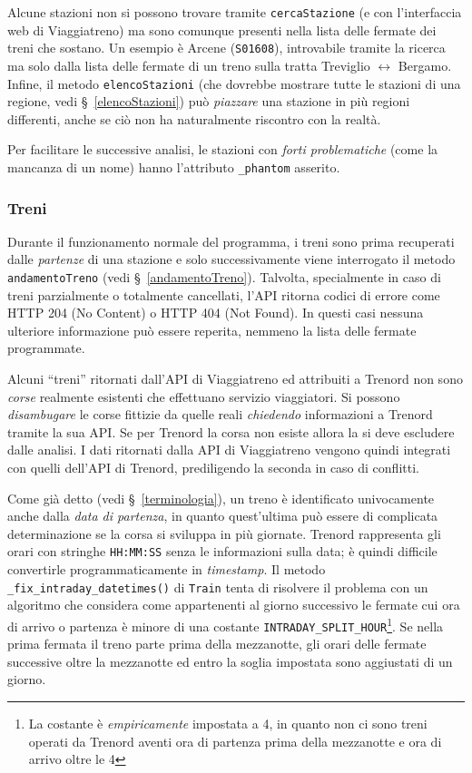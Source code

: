 \documentclass[12pt,italian]{report}
\begin{document}
Alcune stazioni non si possono trovare tramite \texttt{cercaStazione}
(e con l'interfaccia web di Viaggiatreno) ma sono comunque presenti
nella lista delle fermate dei treni che sostano.  Un esempio è Arcene
(\texttt{S01608}), introvabile tramite la ricerca ma solo dalla lista
delle fermate di un treno sulla tratta Treviglio $\leftrightarrow$
Bergamo.  Infine, il metodo \texttt{elencoStazioni} (che dovrebbe
mostrare tutte le stazioni di una regione, vedi
\S~\ref{elencoStazioni}) può \textit{piazzare} una stazione in più
regioni differenti, anche se ciò non ha naturalmente riscontro con la
realtà.

Per facilitare le successive analisi, le stazioni con \textit{forti
    problematiche} (come la mancanza di un nome) hanno l'attributo
\texttt{\_phantom} asserito.

\subsubsection{Treni}

Durante il funzionamento normale del programma, i treni sono prima
recuperati dalle \textit{partenze} di una stazione e solo
successivamente viene interrogato il metodo \texttt{andamentoTreno}
(vedi \S~\ref{andamentoTreno}).  Talvolta, specialmente in caso di
treni parzialmente o totalmente cancellati, l'API ritorna codici di
errore come HTTP 204 (No Content) o HTTP 404 (Not Found).  In questi
casi nessuna ulteriore informazione può essere reperita, nemmeno la
lista delle fermate programmate.

Alcuni ``treni'' ritornati dall'API di Viaggiatreno ed attribuiti a
Trenord non sono \textit{corse} realmente esistenti che effettuano
servizio viaggiatori.  Si possono \textit{disambugare} le corse
fittizie da quelle reali \textit{chiedendo} informazioni a Trenord
tramite la sua API\@.  Se per Trenord la corsa non esiste allora la si
deve escludere dalle analisi.  I dati ritornati dalla API di
Viaggiatreno vengono quindi integrati con quelli dell'API di Trenord,
prediligendo la seconda in caso di conflitti.

Come già detto (vedi \S~\ref{terminologia}), un treno è identificato
univocamente anche dalla \textit{data di partenza}, in quanto
quest'ultima può essere di complicata determinazione se la corsa si
sviluppa in più giornate.  Trenord rappresenta gli orari con stringhe
\texttt{HH:MM:SS} senza le informazioni sulla data; è quindi difficile
convertirle programmaticamente in \textit{timestamp}.  Il metodo
\texttt{\_fix\_intraday\_datetimes()} di \texttt{Train} tenta di
risolvere il problema con un algoritmo che considera come appartenenti
al giorno successivo le fermate cui ora di arrivo o partenza è minore
di una costante \texttt{INTRADAY\_\-SPLIT\_\-HOUR}\footnote{La
    costante è \textit{empiricamente} impostata a 4, in quanto non ci
    sono treni operati da Trenord aventi ora di partenza prima della
    mezzanotte e ora di arrivo oltre le 4}.  Se nella prima fermata il
treno parte prima della mezzanotte, gli orari delle fermate successive
oltre la mezzanotte ed entro la soglia impostata sono aggiustati di un
giorno.
\end{document}
